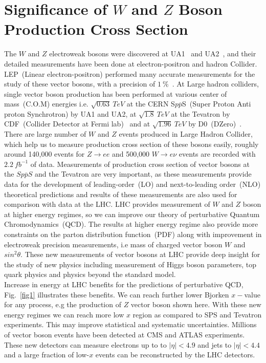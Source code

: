 \section{Significance of $W$ and $Z$ Boson Production Cross Section}
The $W$ and $Z$ electroweak bosons were discovered at UA1~\cite{UA1:1983crd} and UA2~\cite{UA2:1983mlz}, and their detailed measurements have been done at electron-positron and hadron Collider. LEP~(Linear electron-positron) performed many accurate measurements for the study of these vector bosons, with a precision of $1~\%$~\cite{guageboson}. At Large hadron colliders, single vector boson production has been performed  at various center of mass~(C.O.M) energies i.e. $\sqrt{0.63}~TeV$ at the CERN S$p\overline{p}$S~(Super Proton Anti proton Synchrotron) by UA1 and UA2, at $\sqrt{1.8}~TeV$ at the Tevatron by CDF~(Collider Detector at Fermi lab)~\cite{PhysRevLett.62.1005} and  at $\sqrt{1.96}~TeV$ by D0~(DZero)~\cite{PhysRevLett.100.102002}. There are large number of $W$ and $Z$ events produced in Large Hadron Collider, which help us to measure production cross section of these bosons easily, roughly around 140,000 events for $Z\rightarrow ee$ and 500,000 $W\rightarrow e\nu$ events are recorded with $2.2~fb^{-1}$ of data. Measurements of production cross section of vector bosons at the $Sp\overline{p}S$ and the Tevatron are very important, as these measurements provide data for the development of leading-order~(LO) and next-to-leading order~(NLO) theoretical predictions and results of these measurements are also used for comparison with data at the LHC. LHC provides measurement of $W$ and $Z$ boson at higher energy regimes, so we can improve our  theory of perturbative Quantum Chromodynamics~(QCD). The results at higher energy regime also provide more constraints on the parton distribution function~(PDF) along with improvement in electroweak precision measurements, i.e mass of charged vector boson $W$ and $sin^{2}\theta$. These new measurements of vector bosons at LHC provide deep insight for the study of new physics including measurement of Higgs boson parameters, top quark physics and physics beyond the standard model.\\
Increase in energy at LHC benefits for the predictions of perturbative QCD, Fig.~\ref{fig1} illustrates these benefits.  We can reach further lower Bjorken $x-$value for any process, e.g the production of $Z$ vector boson shown here. With these new energy regimes we can reach more low $x$ region as compared to SPS and Tevatron experiments. This may improve statistical and systematic uncertainties. Millions of vector boson events have been detected at CMS and ATLAS experiments. These new detectors can measure electrons up to to $|\eta|<4.9$ and jets to $|\eta|<4.4$ and a large fraction of low-$x$ events can be reconstructed by the LHC detectors.   


